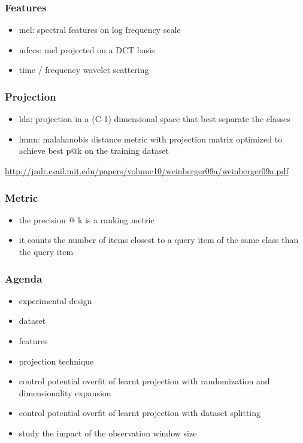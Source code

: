 \documentclass{beamer}
\begin{document}
\begin{frame}\frametitle{Features}
\begin{itemize}
  \item mel: spectral features on log frequency scale
  \item mfccs: mel projected on a DCT basis
  \item time / frequency wavelet scattering
\end{itemize}
\end{frame}

\begin{frame}\frametitle{Projection}
\begin{itemize}
  \item lda: projection in a (C-1) dimensional space that best separate the classes
  \item lmnn: malahanobis distance metric with projection matrix optimized to achieve best p@k on the training dataset
\end{itemize}
\url{http://jmlr.csail.mit.edu/papers/volume10/weinberger09a/weinberger09a.pdf}
\end{frame}

\begin{frame}\frametitle{Metric}
\begin{itemize}
  \item the precision @ k is a ranking metric
  \item it counts the number of items closest to a query item of the same class than the query item
\end{itemize}
\end{frame}

\begin{frame}\frametitle{Agenda}
\begin{itemize}
  \item experimental design
  \item dataset
  \item features
  \item projection technique
  \item control potential overfit of learnt projection with randomization and dimensionality expansion
  \item control potential overfit of learnt projection with dataset splitting
  \item study the impact of the observation window size
\end{itemize}
\end{frame}
\end{document}
